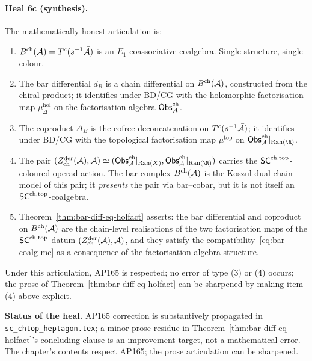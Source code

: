 \paragraph{Heal 6c (synthesis).} The mathematically honest articulation is:
\begin{enumerate}[label=(\arabic*)]
\item $B^{\mathrm{ch}}(\mathcal{A}) = T^c(s^{-1}\bar{\mathcal{A}})$ is an $E_1$ coassociative coalgebra. Single structure, single colour.
\item The bar differential $d_B$ is a chain differential on $B^{\mathrm{ch}}(\mathcal{A})$, constructed from the chiral product; it identifies under BD/CG with the holomorphic factorisation map $\mu^{\mathrm{hol}}_\Delta$ on the factorisation algebra $\mathsf{Obs}^{\mathrm{ch}}_{\mathcal{A}}$.
\item The coproduct $\Delta_B$ is the cofree deconcatenation on $T^c(s^{-1}\bar{\mathcal{A}})$; it identifies under BD/CG with the topological factorisation map $\mu^{\mathrm{top}}$ on $\Obs^{\mathrm{ch}}_\cA|_{\Ran(\R)}$.
\item The pair $(Z^{\mathrm{der}}_{\mathrm{ch}}(\cA), \cA) \simeq (\Obs^{\mathrm{ch}}_\cA|_{\Ran(X)}, \Obs^{\mathrm{ch}}_\cA|_{\Ran(\R)})$ carries the $\mathsf{SC}^{\mathrm{ch},\mathrm{top}}$-coloured-operad action. The bar complex $B^{\mathrm{ch}}(\mathcal{A})$ is the Koszul-dual chain model of this pair; it \emph{presents} the pair via bar--cobar, but it is not itself an $\mathsf{SC}^{\mathrm{ch},\mathrm{top}}$-coalgebra.
\item Theorem~\ref*{thm:bar-diff-eq-holfact} asserts: the bar differential and coproduct on $B^{\mathrm{ch}}(\mathcal{A})$ are the chain-level realisations of the two factorisation maps of the $\mathsf{SC}^{\mathrm{ch},\mathrm{top}}$-datum $(Z^{\mathrm{der}}_{\mathrm{ch}}(\mathcal{A}), \mathcal{A})$, and they satisfy the compatibility~\eqref*{eq:bar-coalg-mc} as a consequence of the factorisation-algebra structure.
\end{enumerate}

Under this articulation, AP165 is respected; no error of type (3) or (4) occurs; the prose of Theorem~\ref*{thm:bar-diff-eq-holfact} can be sharpened by making item (4) above explicit.

\textbf{Status of the heal.} AP165 correction is substantively propagated in \texttt{sc\_chtop\_heptagon.tex}; a minor prose residue in Theorem~\ref*{thm:bar-diff-eq-holfact}'s concluding clause is an improvement target, not a mathematical error. The chapter's contents respect AP165; the prose articulation can be sharpened.

